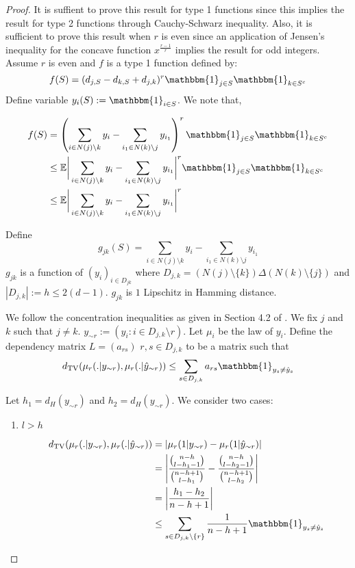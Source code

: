 \documentclass[final,12pt]{colt2018}
\begin{document}
\begin{proof}
It is suffient to prove this result for type 1 functions since this implies the result for type 2 functions through Cauchy-Schwarz inequality. Also, it is sufficient to prove this result when $r$ is even since an application of Jensen's inequality for the concave function $x^{\frac{r-1}{r}}$ implies the result for odd integers.
Assume $r$ is even and $f$ is a type 1 function defined by:
$$f(S) = (d_{j,S}-d_{k,S} + d_{j,k})^r \mathbbm{1}_{j \in S}\mathbbm{1}_{k \in S^c}$$
Define variable $y_i(S) := \mathbbm{1}_{i \in S} $. We note that,




\begin{align*}
f(S)&= \left(\sum_{i\in N(j)\setminus {k}} y_i - \sum_{i_1 \in N(k)\setminus{j}} y_{i_1}\right)^r \mathbbm{1}_{j \in S}\mathbbm{1}_{k \in S^c} \\
 &\leq \mathbb{E}\biggr \rvert\sum_{i\in N(j)\setminus {k}} y_i - \sum_{i_1 \in N(k)\setminus{j}} y_{i_1}\biggr \rvert^r \mathbbm{1}_{j \in S}\mathbbm{1}_{k \in S^c} \\
&\leq \mathbb{E}\biggr \rvert\sum_{i\in N(j)\setminus {k}} y_i - \sum_{i_1 \in N(k)\setminus{j}} y_{i_1}\biggr \rvert^r
\end{align*}

Define $$g_{jk}(S) = \sum_{i\in N(j)\setminus {k}} y_i - \sum_{i_1 \in N(k)\setminus{j}} y_{i_1}$$
$g_{jk}$ is a function of $(y_i)_{i\in D_{jk}}$ where $D_{j,k}= \left(N(j)\setminus\{k\}\right)\Delta \left(N(k)\setminus\{j\}\right)$ and $|D_{j,k}| := h \leq 2(d-1)$. $g_{jk}$ is $1$ Lipschitz in Hamming distance.

We follow the concentration inequalities as given in Section 4.2 of  \citet{chatterjee2005concentration}. 
We fix $j$ and $k$ such that $j \neq k$. $y_{\sim r} := (y_i : i \in D_{j,k}\setminus r)$. Let $\mu_i$ be the law of $y_i$. Define the dependency matrix $L = (a_{rs})$  $r,s \in D_{j,k}$ to be a matrix such that $$ d_{\mathrm{TV}}(\mu_{r}(.|y_{\sim r}),\mu_{r}(.|\hat{y}_{\sim r})) \leq \sum_{s \in D_{j,k}} a_{rs}\mathbbm{1}_{y_s \neq \hat{y}_s }$$

Let $h_1 =  d_H(y_{\sim r})$ and $h_2 = d_H(y_{\sim r})$. We consider two cases:

\begin{enumerate}
\item  $l > h$

 \begin{align*}
d_{\mathrm{TV}}(\mu_{r}(.|y_{\sim r}),\mu_{r}(.|\hat{y}_{\sim r})) &= |\mu_{r}(1|y_{\sim r}) - \mu_{r}(1|\hat{y}_{\sim r})| \\
&= \left| \frac{{{n-h}\choose{l-h_1-1}}}{{{n-h+1}\choose{l-h_1}}}  - \frac{{{n-h}\choose{l-h_2-1}}}{{{n-h+1}\choose{l-h_2}}}\right| \\
&= \left|\frac{h_1-h_2}{n-h+1}\right| \\
&\leq \sum_{s \in D_{j,k}\setminus\{r\}} \frac{1}{n-h+1} \mathbbm{1}_{y_s \neq \hat{y}_s }
\end{align*}


\end{enumerate}
\end{proof}
\end{document}
